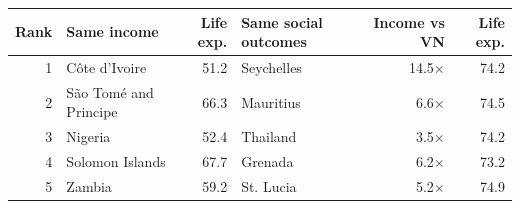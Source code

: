 \small
\begin{tabular}{rlrlrr}
\toprule
Rank & Same income & Life exp. & Same social outcomes & Income vs VN & Life exp. \\
\midrule
1 & Côte d'Ivoire & 51.2 & Seychelles & 14.5$\times$ & 74.2 \\
2 & São Tomé and Principe & 66.3 & Mauritius & 6.6$\times$ & 74.5 \\
3 & Nigeria & 52.4 & Thailand & 3.5$\times$ & 74.2 \\
4 & Solomon Islands & 67.7 & Grenada & 6.2$\times$ & 73.2 \\
5 & Zambia & 59.2 & St. Lucia & 5.2$\times$ & 74.9 \\
\bottomrule
\end{tabular}
